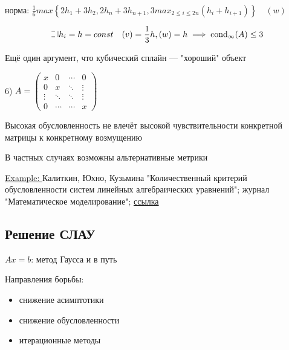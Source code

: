 \(\text{норма: } \frac{1}{6} max \left\{ 2h_1 + 3h_2, 2h_n + 3h_{n+1}, 3max_{2 \leq i \leq 2n} \left( h_i + h_{i+1} \right) \right\} \quad (w)\)

\[\letus h_i = h=const \quad (v) = \frac{1}{3} h, (w) = h \implies \text{cond}_{\infty}(A) \leq 3\]

Ещё один аргумент, что кубический сплайн — "хороший" объект

6) \( A = \begin{pmatrix} x & 0 & \cdots & 0 \\ 0 & x & \ddots & \vdots \\ \vdots & \ddots & \ddots & \vdots \\ 0 & \cdots & \cdots & x\end{pmatrix} \)  



Высокая обусловленность не влечёт высокой чувствительности конкретной матрицы к конкретному возмущению

В частных случаях возможны альтернативные метрики

\underline{Example: } Калиткин, Юхно, Кузьмина "Количественный критерий обусловленности систем линейных алгебраических уравнений"; журнал "Математическое моделирование"; \href{https://www.mathnet.ru/php/archive.phtml?wshow=paper&jrnid=mm&paperid=3070&option_lang=rus}{ссылка}


\subsection{Решение СЛАУ}

\( Ax = b \): метод Гаусса и в путь

\vspace{5mm}
Направления борьбы:
\begin{itemize}
    \item снижение асимптотики
    \item снижение обусловленности
    \item итерационные методы
\end{itemize}

